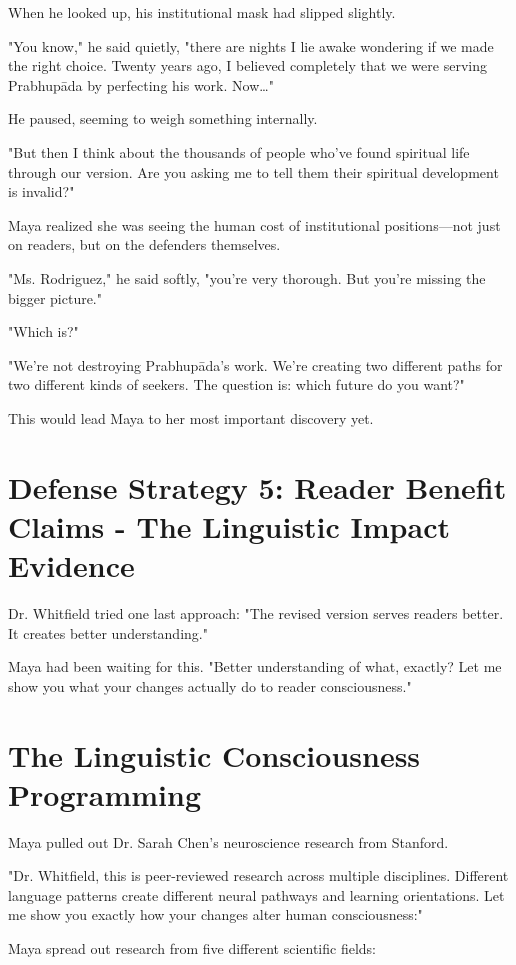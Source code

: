 \documentclass[11pt,twoside]{book}
\begin{document}
When he looked up, his institutional mask had slipped slightly. 

"You know," he said quietly, "there are nights I lie awake wondering if we made the right choice. Twenty years ago, I believed completely that we were serving Prabhupāda by perfecting his work. Now\ldots{}"

He paused, seeming to weigh something internally.

"But then I think about the thousands of people who've found spiritual life through our version. Are you asking me to tell them their spiritual development is invalid?"

Maya realized she was seeing the human cost of institutional positions—not just on readers, but on the defenders themselves.

"Ms. Rodriguez," he said softly, "you're very thorough. But you're missing the bigger picture."

"Which is?"

"We're not destroying Prabhupāda's work. We're creating two different paths for two different kinds of seekers. The question is: which future do you want?"

This would lead Maya to her most important discovery yet.
\section*{Defense Strategy 5: Reader Benefit Claims - The Linguistic Impact Evidence}
\label{sec:org6d1e829}

Dr. Whitfield tried one last approach: "The revised version serves readers better. It creates better understanding."

Maya had been waiting for this. "Better understanding of what, exactly? Let me show you what your changes actually do to reader consciousness."
\section*{The Linguistic Consciousness Programming}
\label{sec:org303822a}

Maya pulled out Dr. Sarah Chen's neuroscience research from Stanford.

"Dr. Whitfield, this is peer-reviewed research across multiple disciplines. Different language patterns create different neural pathways and learning orientations. Let me show you exactly how your changes alter human consciousness:"

Maya spread out research from five different scientific fields:
\end{document}
